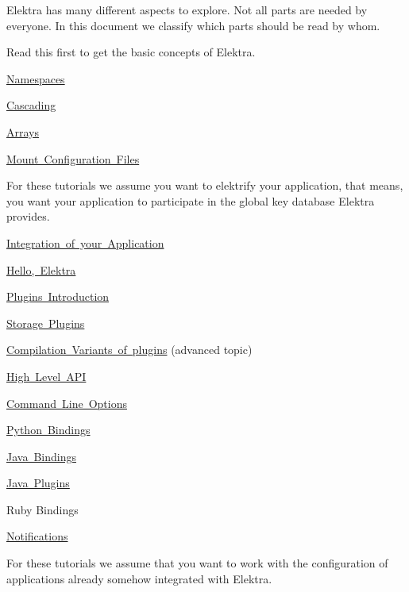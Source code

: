 Elektra has many different aspects to explore. Not all parts are needed by everyone. In this document we classify which parts should be read by whom.

Read this first to get the basic concepts of Elektra.


\begin{DoxyItemize}
\item \mbox{\hyperlink{doc_tutorials_namespaces_md}{Namespaces}}
\item \mbox{\hyperlink{doc_tutorials_cascading_md}{Cascading}}
\item \mbox{\hyperlink{doc_tutorials_arrays_md}{Arrays}}
\item \mbox{\hyperlink{doc_tutorials_mount_md}{Mount Configuration Files}}
\end{DoxyItemize}

For these tutorials we assume you want to elektrify your application, that means, you want your application to participate in the global key database Elektra provides.


\begin{DoxyItemize}
\item \mbox{\hyperlink{doc_tutorials_application-integration_md}{Integration of your Application}}
\item \mbox{\hyperlink{doc_tutorials_hello-elektra_md}{Hello, Elektra}}
\item \mbox{\hyperlink{doc_tutorials_plugins_md}{Plugins Introduction}}
\item \mbox{\hyperlink{doc_tutorials_storage-plugins_md}{Storage Plugins}}
\item \mbox{\hyperlink{doc_tutorials_compilation-variants_md}{Compilation Variants of plugins}} (advanced topic)
\item \mbox{\hyperlink{doc_tutorials_highlevel_md}{High Level A\+PI}}
\item \mbox{\hyperlink{doc_tutorials_command-line-options_md}{Command Line Options}}
\item \mbox{\hyperlink{doc_tutorials_python-kdb_md}{Python Bindings}}
\item \mbox{\hyperlink{doc_tutorials_java-kdb_md}{Java Bindings}}
\item \mbox{\hyperlink{doc_tutorials_java-plugins_md}{Java Plugins}}
\item Ruby Bindings
\item \mbox{\hyperlink{doc_tutorials_notifications_md}{Notifications}}
\end{DoxyItemize}

For these tutorials we assume that you want to work with the configuration of applications already somehow integrated with Elektra.


